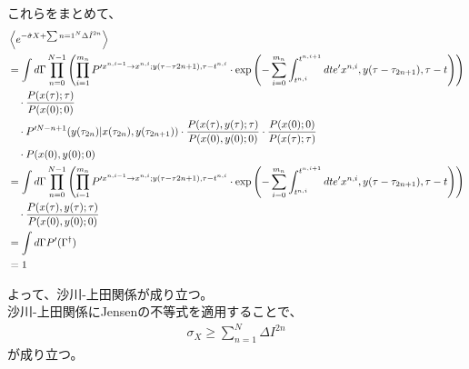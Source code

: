 \documentclass[a4paper,11pt]{jsarticle}
\numberwithin{equation}{section}
\begin{document}
これらをまとめて、
\begin{align}
    &\left\langle e^{-\hat{\sigma}X + \sum{n=1}^N \Delta \hat{I}^{2n}} \right\rangle \\
    &= \int d\Gamma \prod_{n=0}^{N-1} \left( \prod_{i=1}^{m_n} P'^{x^{n,i-1} \to x^{n,i}; y(\tau-\tau{2n+1}), \tau - t^{n,i}} \cdot \exp \left( -\sum_{i=0}^{m_n} \int_{t^{n,i}}^{t^{n,i+1}} dt e'{x^{n,i}, y(\tau-\tau_{2n+1}), \tau - t} \right) \right) \notag \\
    &\quad \cdot \frac{P(x(\tau); \tau)}{P(x(0); 0)} \\
    &\quad \cdot P'^{N-n+1}(y(\tau_{2n}) | x(\tau_{2n}), y(\tau_{2n+1})) \cdot \frac{P(x(\tau),y(\tau); \tau)}{P(x(0), y(0); 0)} \cdot \frac{P(x(0); 0)}{P(x(\tau); \tau)} \\
    &\quad \cdot P(x(0),y(0); 0)\\
    &= \int d\Gamma \prod_{n=0}^{N-1} \left( \prod_{i=1}^{m_n} P'^{x^{n,i-1} \to x^{n,i}; y(\tau-\tau{2n+1}), \tau - t^{n,i}} \cdot \exp \left( -\sum_{i=0}^{m_n} \int_{t^{n,i}}^{t^{n,i+1}} dt e'{x^{n,i}, y(\tau-\tau_{2n+1}), \tau - t} \right) \right) \notag \\
    &\quad \cdot \frac{P(x(\tau),y(\tau); \tau)}{P(x(0), y(0); 0)} \\
    &= \int d\Gamma P'(\Gamma^{\dagger}) \\
    &= 1
    \end{align}

よって、沙川-上田関係が成り立つ。\hfill\qedsymbol\\

沙川-上田関係にJensenの不等式を適用することで、
\begin{align}
    \sigma_X \geq \sum_{n=1}^N \Delta I^{2n}
\end{align}
が成り立つ。
\end{document}
